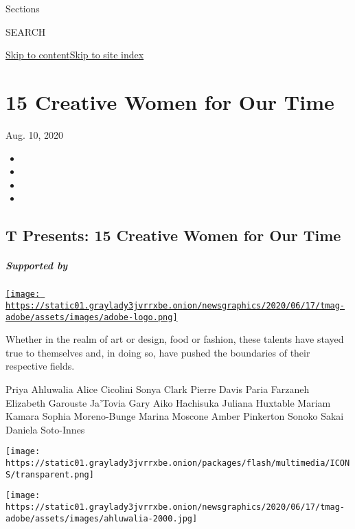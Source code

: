 Sections

SEARCH

\protect\hyperlink{site-content}{Skip to
content}\protect\hyperlink{site-index}{Skip to site index}

\hypertarget{15-creative-women-for-our-time}{%
\section{15 Creative Women for Our
Time}\label{15-creative-women-for-our-time}}

Aug. 10, 2020

\begin{itemize}
\item
\item
\item
\item
\end{itemize}

\href{https://www.nytimes3xbfgragh.onion/section/t-magazine}{}

\hypertarget{t-presents-15-creative-women-for-our-time}{%
\subsection{T Presents: 15 Creative Women for Our
Time}\label{t-presents-15-creative-women-for-our-time}}

\hypertarget{supported-by}{%
\subparagraph{Supported by}\label{supported-by}}

\href{https://www.adobe.com/}{\texttt{[image: https://static01.graylady3jvrrxbe.onion/newsgraphics/2020/06/17/tmag-adobe/assets/images/adobe-logo.png]}}

Whether in the realm of art or design, food or fashion, these talents
have stayed true to themselves and, in doing so, have pushed the
boundaries of their respective fields.

Priya Ahluwalia Alice Cicolini Sonya Clark Pierre Davis Paria Farzaneh
Elizabeth Garouste Ja'Tovia Gary Aiko Hachisuka Juliana Huxtable Mariam
Kamara Sophia Moreno-Bunge Marina Moscone Amber Pinkerton Sonoko Sakai
Daniela Soto-Innes

\href{https://www.nytimes3xbfgragh.onion/2020/08/10/t-magazine/priya-ahluwalia-fashion-menswear.html}{}

\texttt{[image: https://static01.graylady3jvrrxbe.onion/packages/flash/multimedia/ICONS/transparent.png]}

\texttt{[image: https://static01.graylady3jvrrxbe.onion/newsgraphics/2020/06/17/tmag-adobe/assets/images/ahluwalia-2000.jpg]}

